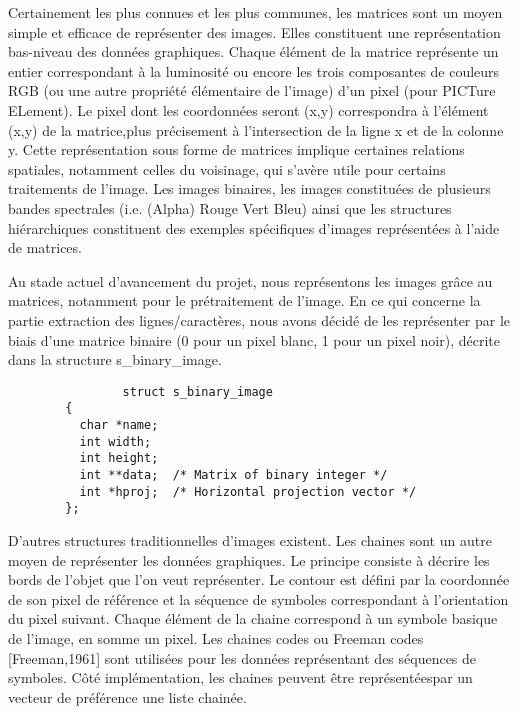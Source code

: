 \documentclass[]{report}
\begin{document}
      Certainement les plus connues et les plus communes, les matrices sont un moyen simple et efficace de représenter des images. Elles constituent une représentation bas-niveau des données graphiques. Chaque élément de la matrice représente un entier correspondant à la luminosité ou encore les trois composantes de couleurs RGB (ou une autre propriété élémentaire de l'image) d'un pixel (pour PICTure ELement). Le pixel dont les coordonnées seront (x,y) correspondra à l'élément (x,y) de la matrice,plus précisement à l'intersection de la ligne x et de la colonne y. Cette représentation sous forme de matrices implique certaines relations spatiales, notamment celles du voisinage, qui s'avère utile pour certains traitements de l'image. Les images binaires, les images constituées de plusieurs bandes spectrales (i.e. (Alpha) Rouge Vert Bleu) ainsi que les structures hiérarchiques constituent des exemples spécifiques d'images représentées à l'aide de matrices.


      Au stade actuel d'avancement du projet, nous représentons les images grâce au matrices, notamment pour le prétraitement de l'image. En ce qui concerne la partie extraction des lignes/caractères, nous avons décidé de les représenter par le biais d'une matrice binaire (0 pour un pixel blanc, 1 pour un pixel noir), décrite dans la structure s_binary_image.

      \begin{verbatim}
				struct s_binary_image
        {
          char *name;
          int width;
          int height;
          int **data;  /* Matrix of binary integer */
          int *hproj;  /* Horizontal projection vector */
        };
			\end{verbatim}

      D'autres structures traditionnelles d'images existent. Les chaines sont un autre moyen de représenter les données graphiques. Le principe consiste à décrire les bords de l'objet que l'on veut représenter. Le contour est défini par la coordonnée de son pixel de référence et la séquence de symboles correspondant à l'orientation du pixel suivant. Chaque élément de la chaine correspond à un symbole basique de l'image, en somme un pixel. Les chaines codes ou Freeman codes [Freeman,1961] sont utilisées pour les données représentant des séquences de symboles. Côté implémentation, les chaines peuvent être représentéespar un vecteur de préférence une liste chainée.

\end{document}

